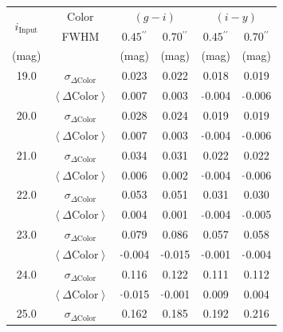 \documentclass[useamsfonts]{pasj01}
\def\asec{$^{\prime\prime}$}
\def\forced{\texttt{forced}}
\newcommand{\minus}{\raisebox{.4\height}{\scalebox{.8}{-}}}
\newcommand{\scolor}{$\sigma_{\Delta\mathrm{Color}}$}
\newcommand{\mcolor}{$\left<{\Delta\mathrm{Color}}\right>$}
\newcommand{\n}{$\minus$}
\begin{document}
\begin{table}
    \begin{center}
    \begin{tabular}{| c | c | c | c | c | c | }
    \hline
    \rowcolor[gray]{.85} \multicolumn{6}{|c|}{\large{Table}: Summary of \forced{} PSF Colors} \\
    \hline \hline 
    \multirow{2}{*}{$i_{\mathrm{Input}}$} & Color & \multicolumn{2}{|c|}{$(g-i)$} & \multicolumn{2}{|c|}{$(i-y)$} \\
    \cline{2-6}
      & FWHM & $0.45$\asec{} & $0.70$\asec{} & $0.45$\asec{} & $0.70$\asec{} \\
    \hline
    (mag) & & (mag) & (mag) & (mag) & (mag) \\
    \hline
    \rowcolor[gray]{.85} 19.0 & \scolor{} &   0.023 &   0.022 &   0.018 &   0.019 \\
    \rowcolor[gray]{.85}      & \mcolor{} &   0.007 &   0.003 & \n0.004 & \n0.006 \\
    \hline 
    \rowcolor[gray]{1.0} 20.0 & \scolor{} &   0.028 &   0.024 &   0.019 &   0.019 \\
    \rowcolor[gray]{1.0}      & \mcolor{} &   0.007 &   0.003 & \n0.004 & \n0.006 \\
    \hline
    \rowcolor[gray]{.85} 21.0 & \scolor{} &   0.034 &   0.031 &   0.022 &   0.022 \\
    \rowcolor[gray]{.85}      & \mcolor{} &   0.006 &   0.002 & \n0.004 & \n0.006 \\
    \hline
    \rowcolor[gray]{1.0} 22.0 & \scolor{} &   0.053 &   0.051 &   0.031 &   0.030 \\
    \rowcolor[gray]{1.0}      & \mcolor{} &   0.004 &   0.001 & \n0.004 & \n0.005 \\
    \hline
    \rowcolor[gray]{.85} 23.0 & \scolor{} &   0.079 &   0.086 &   0.057 &   0.058 \\
    \rowcolor[gray]{.85}      & \mcolor{} & \n0.004 & \n0.015 & \n0.001 & \n0.004 \\
    \hline
    \rowcolor[gray]{1.0} 24.0 & \scolor{} &   0.116 &   0.122 &   0.111 &   0.112 \\
    \rowcolor[gray]{1.0}      & \mcolor{} & \n0.015 & \n0.001 &   0.009 &   0.004 \\
    \hline
    \rowcolor[gray]{.85} 25.0 & \scolor{} &   0.162 &   0.185 &   0.192 &   0.216 \\

\end{tabular}
\end{center}
\end{table}
\end{document}
